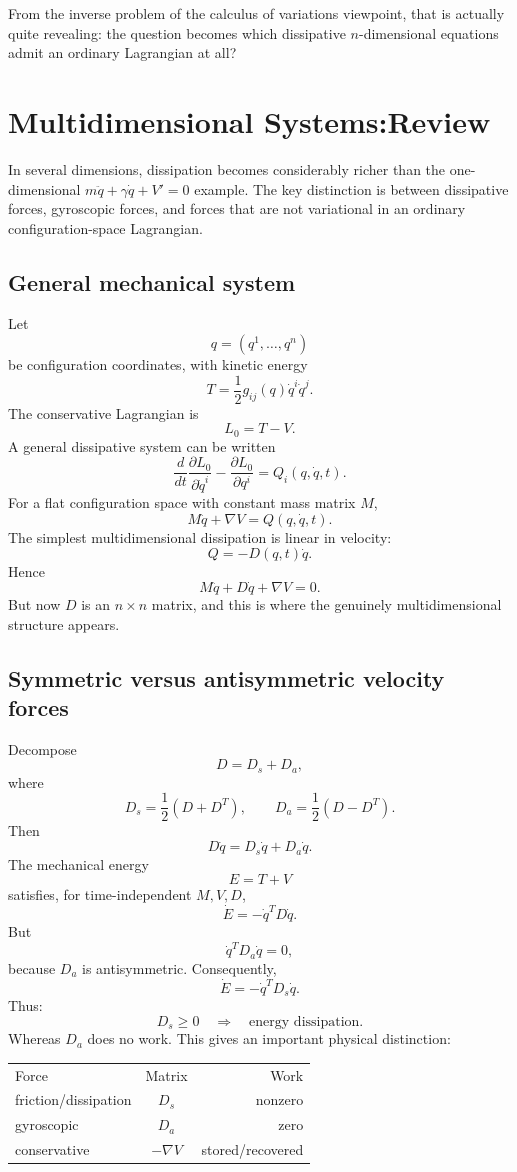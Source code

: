 From the inverse problem of the calculus of variations viewpoint, that is actually quite revealing: the question becomes which dissipative \(n\)-dimensional equations admit an ordinary Lagrangian at all?


\section{Multidimensional  Systems:Review}

In several dimensions, dissipation becomes considerably richer than the one-dimensional \(m\ddot q+\gamma\dot q+V'=0\) example. The key distinction is between dissipative forces, gyroscopic forces, and forces that are not variational in an ordinary configuration-space Lagrangian.

\subsection{General mechanical system}

Let $$ q=(q^1,\ldots,q^n) $$
be configuration coordinates, with kinetic energy
$$ T=\frac12 g_{ij}(q)\dot q^i\dot q^j. $$
The conservative Lagrangian is $$ L_0=T-V. $$
A general dissipative system can be written
$$ \boxed{ \frac{d}{dt}\frac{\partial L_0}{\partial\dot q^i} -\frac{\partial L_0}{\partial q^i} =Q_i(q,\dot q,t). } $$
For a flat configuration space with constant mass matrix \(M\),
$$ \boxed{ M\ddot q+ \nabla V = Q(q,\dot q,t). } $$
The simplest multidimensional dissipation is linear in velocity:
$$ \boxed{ Q=-D(q,t)\dot q. } $$
Hence
$$ \boxed{ M\ddot q+D\dot q+\nabla V=0. } $$
But now \(D\) is an \(n\times n\) matrix, and this is where the genuinely multidimensional structure appears.

\subsection{ Symmetric versus antisymmetric velocity forces}
Decompose $$ D=D_s+D_a, $$
where $$ D_s=\frac12(D+D^T), \qquad D_a=\frac12(D-D^T).$$
Then $$ D\dot q=D_s\dot q+D_a\dot q. $$
The mechanical energy $$ E=T+V $$
satisfies, for time-independent \(M,V,D\),
$$ \dot E = -\dot q^T D\dot q. $$
But $$ \dot q^TD_a\dot q=0, $$
because \(D_a\) is antisymmetric. Consequently,
$$ \boxed{ \dot E=-\dot q^T D_s\dot q. } $$
Thus:
$$\boxed{ D_s\geq0 \quad\Longrightarrow\quad \text{energy dissipation}.} $$
Whereas \(D_a\) does no work.
This gives an important physical distinction:

\begin{tabular} {l c r}
    Force &	Matrix &	Work\\
    friction/dissipation &	\(D_s\)	& nonzero \\
    gyroscopic &	\(D_a\)	& zero \\
    conservative &	\(-\nabla V\) &	stored/recovered
\end{tabular}

